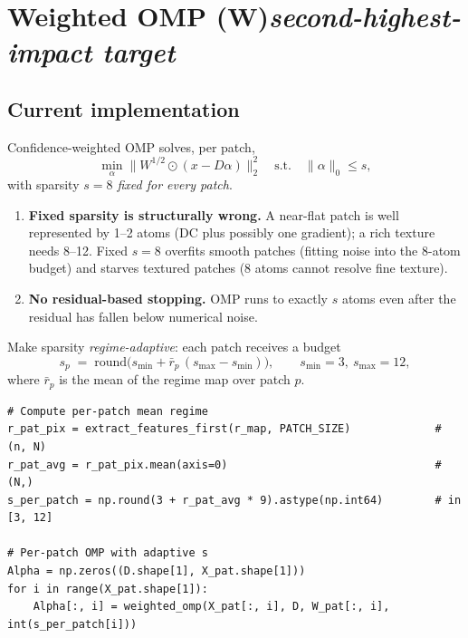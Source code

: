 \documentclass[11pt,a4paper]{article}
\begin{document}
\section{Weighted OMP (W)\quad\textmd{\textit{second-highest-impact target}}}\label{sec:W}

\subsection*{Current implementation}

Confidence-weighted OMP solves, per patch,
\begin{equation}
    \min_{\alpha} \bigl\|W^{1/2}\!\odot(x - D\alpha)\bigr\|_2^2
    \quad\text{s.t.}\quad \|\alpha\|_0 \le s,
\end{equation}
with sparsity \emph{$s = 8$ fixed for every patch}.

\begin{issuebox}
\begin{enumerate}[leftmargin=1.2em,itemsep=2pt]
    \item \textbf{Fixed sparsity is structurally wrong.} A near-flat patch
    is well represented by 1--2 atoms (DC plus possibly one gradient); a
    rich texture needs 8--12. Fixed $s = 8$ overfits smooth patches
    (fitting noise into the 8-atom budget) and starves textured patches
    (8 atoms cannot resolve fine texture).
    \item \textbf{No residual-based stopping.} OMP runs to exactly $s$
    atoms even after the residual has fallen below numerical noise.
\end{enumerate}
\end{issuebox}

\begin{fixbox}
Make sparsity \emph{regime-adaptive}: each patch receives a budget
\begin{equation}
    s_p \;=\; \mathrm{round}\!\bigl(s_{\min} + \bar r_p\,(s_{\max} - s_{\min})\bigr),
    \qquad s_{\min} = 3,\ s_{\max} = 12,
\end{equation}
where $\bar r_p$ is the mean of the regime map over patch $p$.
\end{fixbox}

\begin{lstlisting}[caption={Regime-adaptive per-patch sparsity in run.py.}]
# Compute per-patch mean regime
r_pat_pix = extract_features_first(r_map, PATCH_SIZE)             # (n, N)
r_pat_avg = r_pat_pix.mean(axis=0)                                # (N,)
s_per_patch = np.round(3 + r_pat_avg * 9).astype(np.int64)        # in [3, 12]

# Per-patch OMP with adaptive s
Alpha = np.zeros((D.shape[1], X_pat.shape[1]))
for i in range(X_pat.shape[1]):
    Alpha[:, i] = weighted_omp(X_pat[:, i], D, W_pat[:, i], int(s_per_patch[i]))
\end{lstlisting}
\end{document}
